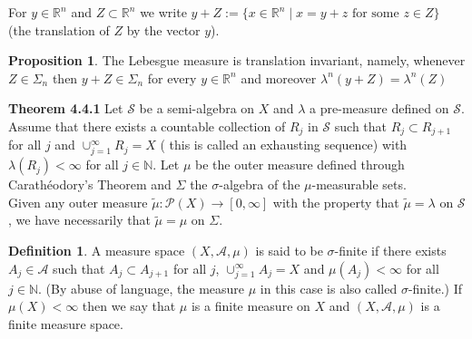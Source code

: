 \documentclass[a4paper,14pt]{extarticle}
\theoremstyle{definition}
\newtheorem{definition}{Definition}
\newtheorem{proposition}{Proposition}
\begin{document}
\noindent For $y\in\mathbb{R}^n$ and $Z\subset\mathbb{R}^n$ we write $y+Z:=\{x\in\mathbb{R}^n\mid x=y+z\text{ for some }z\in Z\}$ (the translation of $Z$ by the vector $y$).
\begin{proposition}
  The Lebesgue measure is translation invariant, namely, whenever $Z\in\Sigma_n$ then $y+Z\in\Sigma_n$ for every $y\in\mathbb{R}^n$ and moreover $\lambda^n(y+Z)=\lambda^n(Z)$
\end{proposition}
\noindent\textbf{Theorem 4.4.1} Let $\mathcal{S}$ be a semi-algebra on $X$ and $\lambda$ a pre-measure defined on $\mathcal{S}$. Assume that there exists a countable collection of $R_j$ in $\mathcal{S}$ such that $R_j\subset R_{j+1}$ for all $j$ and $\cup_{j=1}^\infty R_j=X$ ( this is called an exhausting sequence) with $\lambda(R_j)<\infty$ for all $j\in\mathbb{N}$. Let $\mu$ be the outer measure defined through
Carathéodory's Theorem
and $\Sigma$ the $\sigma$-algebra of the $\mu$-measurable sets. \\
Given any outer measure $\tilde{\mu}:\mathcal{P}(X)\rightarrow[0,\infty]$ with the property that 
$\tilde{\mu}=\lambda$ on $\mathcal{S}$, we have necessarily that $\tilde{\mu}=\mu$ on $\Sigma$.
\begin{definition}
  A measure space $(X,\mathcal{A},\mu)$ is said to be $\sigma$-finite if there exists $A_j\in\mathcal{A}$ such that $A_j\subset A_{j+1}$ for all $j$, $\cup_{j=1}^\infty A_j=X$ and $\mu(A_j)<\infty$ for all $j\in\mathbb{N}$. (By abuse of language, the measure $\mu$ in this case is also called $\sigma$-finite.) If $\mu(X)<\infty$ then we say that $\mu$ is a 
  finite measure on $X$ and $(X,\mathcal{A},\mu)$ is a finite measure space.
\end{definition}
\newpage
\end{document}
